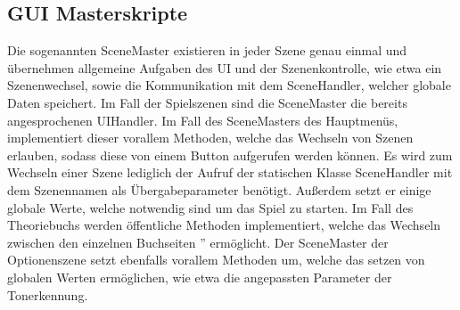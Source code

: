 \subsection*{GUI Masterskripte}
Die sogenannten SceneMaster existieren in jeder Szene genau einmal und übernehmen allgemeine Aufgaben des UI und der Szenenkontrolle, wie etwa ein Szenenwechsel, sowie die Kommunikation mit dem SceneHandler, welcher globale Daten speichert. Im Fall der Spielszenen sind die SceneMaster die bereits angesprochenen UIHandler. Im Fall des SceneMasters des Hauptmenüs, implementiert dieser vorallem Methoden, welche das Wechseln von Szenen erlauben, sodass diese von einem Button aufgerufen werden können. Es wird zum Wechseln einer Szene lediglich der Aufruf der statischen Klasse SceneHandler mit dem Szenennamen als Übergabeparameter benötigt. Außerdem setzt er einige globale Werte, welche notwendig sind um das Spiel zu starten. Im Fall des Theoriebuchs werden öffentliche Methoden implementiert, welche das Wechseln zwischen den einzelnen \glqq Buchseiten '' ermöglicht. Der SceneMaster der Optionenszene setzt ebenfalls vorallem Methoden um, welche das setzen von globalen Werten ermöglichen, wie etwa die angepassten Parameter der Tonerkennung.  

